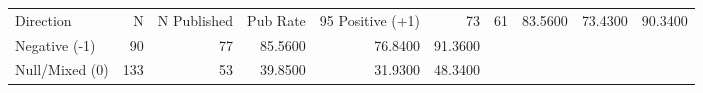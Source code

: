 \begin{tabular}{lrrrrr}
\toprule
Direction & N & N Published & Pub Rate & 95%
\midrule
Positive (+1) & 73 & 61 & 83.5600 & 73.4300 & 90.3400 \\
Negative (-1) & 90 & 77 & 85.5600 & 76.8400 & 91.3600 \\
Null/Mixed (0) & 133 & 53 & 39.8500 & 31.9300 & 48.3400 \\
\bottomrule
\end{tabular}
